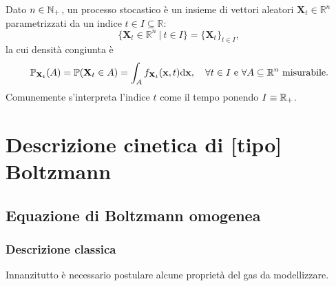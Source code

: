     \begin{dfn}
      \label{defProcessoStocastico}
      Dato \(n\in\mathbb{\mathbb N_+}\), un processo stocastico è un insieme di vettori aleatori \(\mathbf X_t\in\mathbb R^n\) parametrizzati da un indice \(t\in I\subseteq\mathbb R\):
      \[
        \{\mathbf X_t\in\mathbb R^n\ |\ t\in I\}=\{\mathbf X_t\}_{t\in I},
      \]
      la cui densità congiunta è
      \[
        \mathbb P_{\mathbf X_t}(A)=\mathbb P(\mathbf X_t\in A)
        =\int_Af_{\mathbf X_t}(\mathbf x,t)\mathrm{d}\mathbf x,
        \quad\forall t\in I\text{ e }\forall A\subseteq\mathbb R^n\text{ misurabile}.
      \]
      Comunemente s'interpreta l'indice \(t\) come il tempo ponendo \(I\equiv\mathbb R_+\).%
    \end{dfn}

  \section{Descrizione cinetica di [tipo] Boltzmann}\label{secDescrizioneCineticaClassicaETipoBoltzmann}

    \subsection{Equazione di Boltzmann omogenea}\label{secBoltzmannOmogeno}

      \subsubsection{Descrizione classica}

        Innanzitutto è necessario postulare alcune proprietà del gas da modellizzare.

